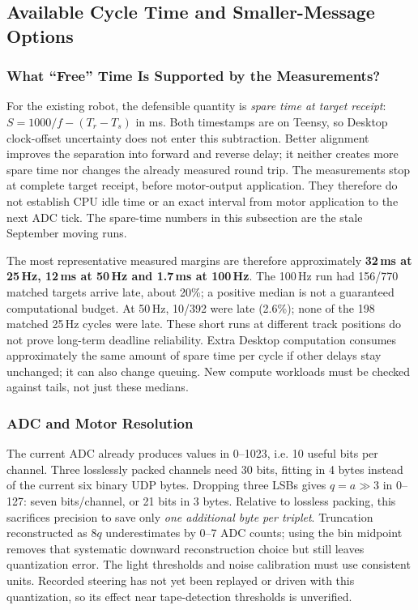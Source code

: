 \subsection{Available Cycle Time and Smaller-Message Options}
\label{sec:timing-budget}
\subsubsection{What ``Free'' Time Is Supported by the Measurements?}
For the existing robot, the defensible quantity is \emph{spare time at target receipt}: $S=1000/f-(T_r-T_s)$ in ms. Both timestamps are on Teensy, so Desktop clock-offset uncertainty does not enter this subtraction. Better alignment improves the separation into forward and reverse delay; it neither creates more spare time nor changes the already measured round trip. The measurements stop at complete target receipt, before motor-output application. They therefore do not establish CPU idle time or an exact interval from motor application to the next ADC tick. The spare-time numbers in this subsection are the stale September moving runs.

\begin{table}[H]
\centering\small
\caption{Stale. Observed spare time in the original unpadded moving runs. Quartiles are in ms. Late means the target arrived after the next nominal sample deadline; the denominator includes only complete matched cycles.}
\label{tab:spare-budget}

\end{table}

The most representative measured margins are therefore approximately \textbf{32\,ms at 25\,Hz, 12\,ms at 50\,Hz and 1.7\,ms at 100\,Hz}. The 100\,Hz run had 156/770 matched targets arrive late, about 20\%; a positive median is not a guaranteed computational budget. At 50\,Hz, 10/392 were late (2.6\%); none of the 198 matched 25\,Hz cycles were late. These short runs at different track positions do not prove long-term deadline reliability. Extra Desktop computation consumes approximately the same amount of spare time per cycle if other delays stay unchanged; it can also change queuing. New compute workloads must be checked against tails, not just these medians.

\subsubsection{ADC and Motor Resolution}
The current ADC already produces values in 0--1023, i.e. 10 useful bits per channel. Three losslessly packed channels need 30 bits, fitting in 4 bytes instead of the current six binary UDP bytes. Dropping three LSBs gives $q=a\mathbin{\gg}3$ in 0--127: seven bits/channel, or 21 bits in 3 bytes. Relative to lossless packing, this sacrifices precision to save only \emph{one additional byte per triplet}. Truncation reconstructed as $8q$ underestimates by 0--7 ADC counts; using the bin midpoint removes that systematic downward reconstruction choice but still leaves quantization error. The light thresholds and noise calibration must use consistent units. Recorded steering has not yet been replayed or driven with this quantization, so its effect near tape-detection thresholds is unverified.

